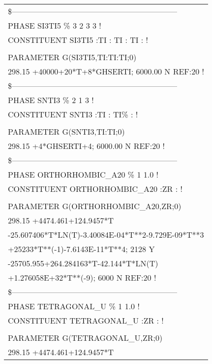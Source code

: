 \begin{longtable}[H]{ l l l }
	\multicolumn{3}{l}{\$---------------------------------------------------------------}\\
	\multicolumn{3}{l}{PHASE SI3TI5  \%  3 2   3   3 !}\\
	\multicolumn{3}{l}{CONSTITUENT SI3TI5  :TI : TI : TI :  !}\\
	& & \\
	PARAMETER G(SI3TI5,TI:TI:TI;0) & &\\
	\multicolumn{3}{l}{298.15 +40000+20*T+8*GHSERTI; 6000.00 N REF:20 !}\\
	\multicolumn{3}{l}{\$---------------------------------------------------------------}\\
	\multicolumn{3}{l}{PHASE SNTI3  \%  2 1   3 !}\\
	\multicolumn{3}{l}{CONSTITUENT SNTI3  :TI : TI\% :  !}\\
	& & \\
	PARAMETER G(SNTI3,TI:TI;0) &  &\\
	\multicolumn{3}{l}{298.15 +4*GHSERTI+4; 6000.00 N REF:20 !}\\
	\multicolumn{3}{l}{\$---------------------------------------------------------------}\\
	\multicolumn{3}{l}{PHASE ORTHORHOMBIC\_A20  \%  1  1.0  !
}\\
	\multicolumn{3}{l}{CONSTITUENT ORTHORHOMBIC\_A20  :ZR :  !}\\
	& & \\
	PARAMETER G(ORTHORHOMBIC\_A20,ZR;0) & &\\
	\multicolumn{3}{l}{298.15 +4474.461+124.9457*T}\\
	\multicolumn{3}{l}{-25.607406*T*LN(T)-3.40084E-04*T**2-9.729E-09*T**3}\\
	\multicolumn{3}{l}{+25233*T**(-1)-7.6143E-11*T**4; 2128 Y}\\
	\multicolumn{3}{l}{-25705.955+264.284163*T-42.144*T*LN(T)}\\
	\multicolumn{3}{l}{+1.276058E+32*T**(-9); 6000 N REF:20 !}\\
	\multicolumn{3}{l}{\$---------------------------------------------------------------}\\
	\multicolumn{3}{l}{PHASE TETRAGONAL\_U  \%  1  1.0  !}\\
	\multicolumn{3}{l}{CONSTITUENT TETRAGONAL\_U  :ZR :  !}\\
	& & \\
	PARAMETER G(TETRAGONAL\_U,ZR;0)&  & \\
	\multicolumn{3}{l}{298.15 +4474.461+124.9457*T}\\

\end{longtable}
